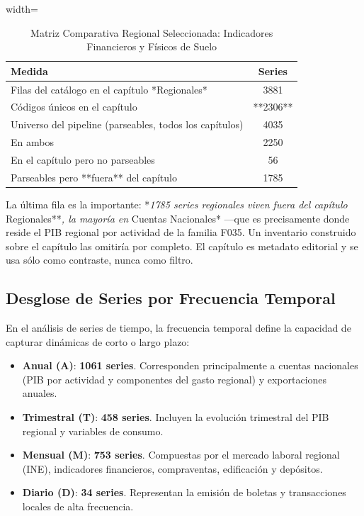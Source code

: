 \documentclass[11pt,a4paper]{article}
\begin{document}
\begin{table}[H]
\centering
\caption{Matriz Comparativa Regional Seleccionada: Indicadores Financieros y Físicos de Suelo}
\begin{adjustbox}{width=\textwidth}
\begin{tabular}{lc}
\toprule
Medida & Series \\
\midrule
Filas del catálogo en el capítulo *Regionales* & 3881 \\
Códigos únicos en el capítulo & **2306** \\
Universo del pipeline (parseables, todos los capítulos) & 4035 \\
En ambos & 2250 \\
En el capítulo pero no parseables & 56 \\
Parseables pero **fuera** del capítulo & 1785 \\
\bottomrule
\end{tabular}
\end{adjustbox}
\end{table}


La última fila es la importante: *\textit{1785 series regionales viven fuera del capítulo }Regionales**\textit{, la mayoría en }Cuentas Nacionales* —que es precisamente donde reside el PIB regional por actividad de la familia F035. Un inventario construido sobre el capítulo las omitiría por completo. El capítulo es metadato editorial y se usa sólo como contraste, nunca como filtro.


\subsection{Desglose de Series por Frecuencia Temporal}
En el análisis de series de tiempo, la frecuencia temporal define la capacidad de capturar dinámicas de corto o largo plazo:
\begin{itemize}
  \item \textbf{Anual (A)}: \textbf{1061 series}. Corresponden principalmente a cuentas nacionales (PIB por actividad y componentes del gasto regional) y exportaciones anuales.
  \item \textbf{Trimestral (T)}: \textbf{458 series}. Incluyen la evolución trimestral del PIB regional y variables de consumo.
  \item \textbf{Mensual (M)}: \textbf{753 series}. Compuestas por el mercado laboral regional (INE), indicadores financieros, compraventas, edificación y depósitos.
  \item \textbf{Diario (D)}: \textbf{34 series}. Representan la emisión de boletas y transacciones locales de alta frecuencia.

\end{itemize}
\end{document}
